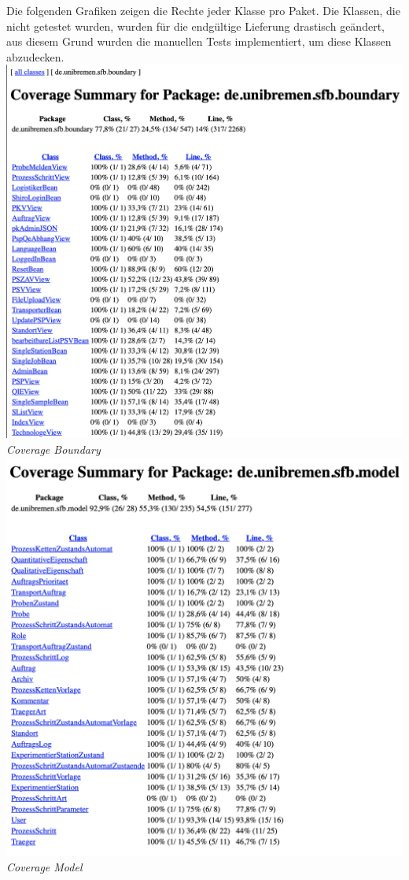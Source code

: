 \documentclass[enabledeprecatedfontcommands,fontsize=12pt,paper=a4,twoside]{scrartcl}
\begin{document}
Die folgenden Grafiken zeigen die Rechte jeder Klasse pro Paket. Die Klassen, die nicht getestet wurden, wurden für die endgültige Lieferung drastisch geändert, aus diesem Grund wurden die manuellen Tests implementiert, um diese Klassen abzudecken.
 \hypertarget{3.4.1.2}{
\includegraphics[width=1\textwidth]{Screenshots/boundary.png}
\textit{ Coverage Boundary}
} \\
 \hypertarget{3.4.1.3}{
\includegraphics[width=1\textwidth]{Screenshots/model.png}
\textit{ Coverage Model}
} \\
\end{document}
